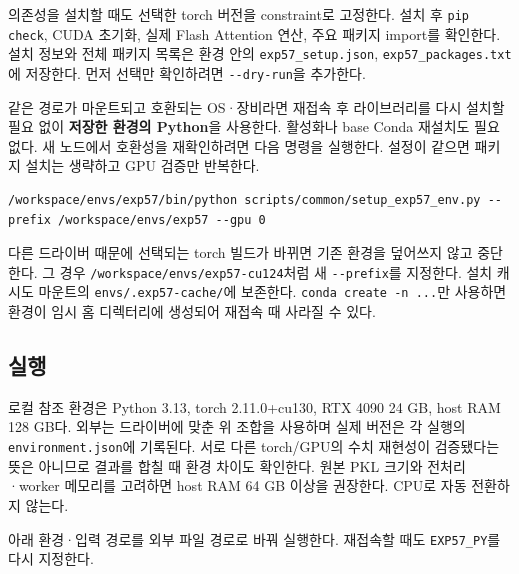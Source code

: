 의존성을 설치할 때도 선택한 torch 버전을 constraint로 고정한다. 설치 후 \texttt{pip chec\allowbreak{}k}, CUDA 초기화, 실제 Flash Attention 연산, 주요 패키지 import를 확인한다. 설치 정보와 전체 패키지 목록은 환경 안의 \texttt{exp57\_\allowbreak{}\allowbreak{}se\allowbreak{}tup.\allowbreak{}json\allowbreak{}}, \texttt{exp57\_\allowbreak{}\allowbreak{}pa\allowbreak{}ckages.\allowbreak{}t\allowbreak{}xt}에 저장한다. 먼저 선택만 확인하려면 \texttt{-\allowbreak{}-\allowbreak{}dry-\allowbreak{}ru\allowbreak{}n}을 추가한다.

같은 경로가 마운트되고 호환되는 OS·장비라면 재접속 후 라이브러리를 다시 설치할 필요 없이 \textbf{저장한 환경의 Python}을 사용한다. 활성화나 base Conda 재설치도 필요 없다. 새 노드에서 호환성을 재확인하려면 다음 명령을 실행한다. 설정이 같으면 패키지 설치는 생략하고 GPU 검증만 반복한다.


\begin{Verbatim}[breaklines=true,breakanywhere=true,fontsize=\scriptsize]
/workspace/envs/exp57/bin/python scripts/common/setup_exp57_env.py --prefix /workspace/envs/exp57 --gpu 0

\end{Verbatim}
다른 드라이버 때문에 선택되는 torch 빌드가 바뀌면 기존 환경을 덮어쓰지 않고 중단한다. 그 경우 \texttt{/\allowbreak{}\allowbreak{}workspa\allowbreak{}ce/\allowbreak{}\allowbreak{}envs/\allowbreak{}\allowbreak{}exp57-\allowbreak{}cu\allowbreak{}124}처럼 새 \texttt{-\allowbreak{}-\allowbreak{}prefix\allowbreak{}}를 지정한다. 설치 캐시도 마운트의 \texttt{envs/\allowbreak{}\allowbreak{}.\allowbreak{}ex\allowbreak{}p57-\allowbreak{}cach\allowbreak{}e/\allowbreak{}\allowbreak{}}에 보존한다. \texttt{conda cr\allowbreak{}eate -\allowbreak{}n \allowbreak{}.\allowbreak{}.\allowbreak{}.\allowbreak{}}만 사용하면 환경이 임시 홈 디렉터리에 생성되어 재접속 때 사라질 수 있다.

\subsection{실행}
로컬 참조 환경은 Python 3.13, torch 2.11.0+\allowbreak{}cu130, RTX 4090 24 GB, host RAM 128 GB다. 외부는 드라이버에 맞춘 위 조합을 사용하며 실제 버전은 각 실행의 \texttt{environm\allowbreak{}ent.\allowbreak{}json\allowbreak{}}에 기록된다. 서로 다른 torch/\allowbreak{}GPU의 수치 재현성이 검증됐다는 뜻은 아니므로 결과를 합칠 때 환경 차이도 확인한다. 원본 PKL 크기와 전처리·worker 메모리를 고려하면 host RAM 64 GB 이상을 권장한다. CPU로 자동 전환하지 않는다.

아래 환경·입력 경로를 외부 파일 경로로 바꿔 실행한다. 재접속할 때도 \texttt{EXP57\_\allowbreak{}\allowbreak{}PY\allowbreak{}}를 다시 지정한다.



